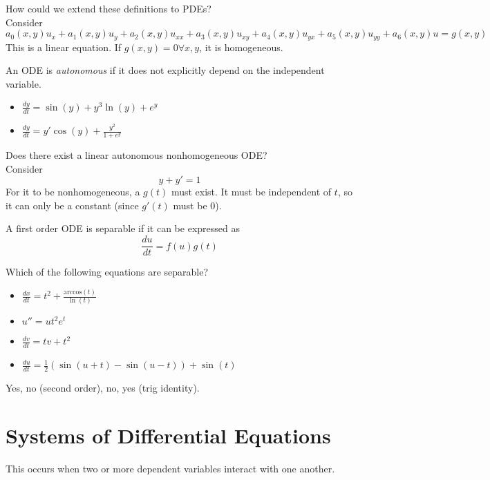 \documentclass[12pt]{article}
\begin{document}
How could we extend these definitions to PDEs? \\
Consider $$a_0(x,y) u_x + a_1(x,y) u_y + a_2(x,y) u_{xx} + a_3(x,y) u_{xy} + a_4(x,y) u_{yx} + a_5(x,y)u_{yy} + a_6(x,y)u = g(x,y)$$
This is a linear equation. If $g(x,y) = 0 \forall x,y$, it is homogeneous.

\begin{defn}
An ODE is \textit{autonomous} if it does not explicitly depend on the independent variable.
\end{defn}

\begin{ex}
\begin{itemize}
\item $\frac{dy}{dt} = \sin(y) + y^3\ln(y) + e^y$ \\
\item $\frac{dy}{dt} = y'\cos(y) + \frac{y^2}{1 + e^y}$ \\
\end{itemize}
\end{ex}

Does there exist a linear autonomous nonhomogeneous ODE? \\
Consider $$y + y' = 1$$
For it to be nonhomogeneous, a $g(t)$ must exist. It must be independent of $t$, so it can only be a constant (since $g'(t)$ must be 0).

\begin{defn}
A first order ODE is separable if it can be expressed as
$$\frac{du}{dt} = f(u)g(t)$$
\end{defn}

\begin{ex}
Which of the following equations are separable?
\begin{itemize}
\item $\frac{dx}{dt} = t^2 + \frac{\text{arccos}(t)}{\ln(t)}$ \\
\item $u'' = ut^2e^t$ \\
\item $\frac{dv}{dt} = tv + t^2$ \\
\item $\frac{du}{dt} = \frac{1}{2}\left(\sin(u+t) - \sin(u-t)\right) + \sin(t)$ \\
\end{itemize}
Yes, no (second order), no, yes (trig identity).
\end{ex}

\section{Systems of Differential Equations}
This occurs when two or more dependent variables interact with one another.
\end{document}
